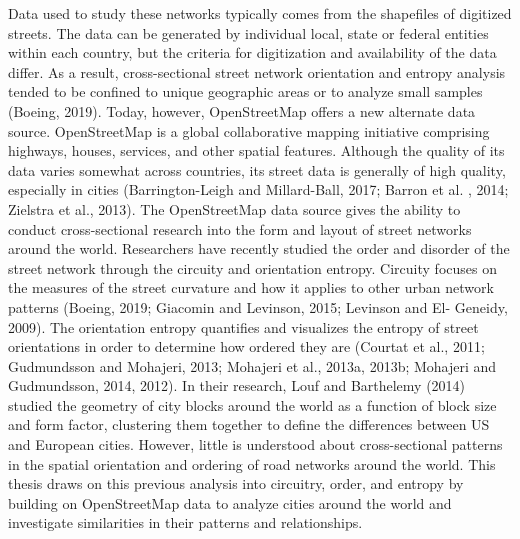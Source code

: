 Data used to study these networks typically comes from the shapefiles of digitized streets. The data can be generated by individual local, state or federal entities within each country, but the criteria for digitization and availability of the data differ. As a result, cross-sectional street network orientation and entropy analysis tended to be confined to unique geographic areas or to analyze small samples (Boeing, 2019). Today, however, OpenStreetMap offers a new alternate data source. OpenStreetMap is a global collaborative mapping initiative comprising highways, houses, services, and other spatial features. Although the quality of its data varies somewhat across countries, its street data is generally of high quality,  especially in cities (Barrington-Leigh and Millard-Ball, 2017; Barron et al. , 2014; Zielstra et al., 2013). The OpenStreetMap data source gives the ability to conduct cross-sectional research into the form and layout of street networks around the world. Researchers have recently studied the order and disorder of the street network through the  circuity and orientation entropy. Circuity focuses on the measures of the street curvature and how it applies to other urban network patterns (Boeing, 2019; Giacomin and Levinson, 2015;  Levinson and El- Geneidy, 2009). The orientation entropy quantifies and visualizes the entropy of street orientations in order to determine how ordered they are (Courtat et al., 2011; Gudmundsson and Mohajeri, 2013; Mohajeri et al., 2013a, 2013b; Mohajeri and Gudmundsson, 2014, 2012). In their research, Louf and Barthelemy (2014) studied the geometry of city blocks around the world as a function of block size and form factor, clustering them together to define the differences between US and European cities. However, little is understood about cross-sectional patterns in the spatial orientation and ordering of road networks around the world. This thesis draws on this previous analysis into circuitry, order, and entropy by building on OpenStreetMap data to analyze cities around the world and investigate similarities in their patterns and relationships.

